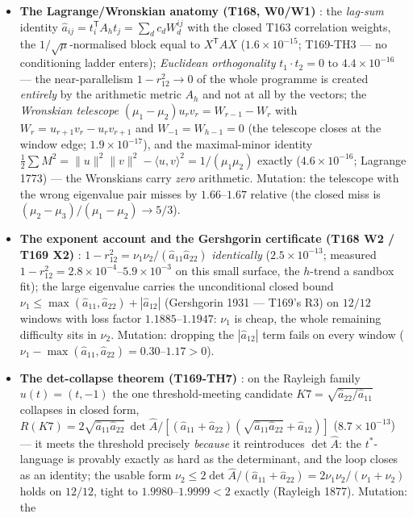 \documentclass[11pt,a4paper]{article}
\begin{document}
\begin{itemize}[leftmargin=1.5em]
\item \textbf{The Lagrange/Wronskian anatomy (T168, W0/W1)} \mE: the \emph{lag-sum}
identity $\hat a_{ij}=t_i^{\mathsf T}A_ht_j=\sum_d c_dW^{ij}_d$ with the closed T163
correlation weights, the $1/\sqrt{\mu}$-normalised block equal to
$X^{\mathsf T}AX$ ($1.6\times10^{-15}$; T169-TH3 --- no conditioning ladder enters);
\emph{Euclidean orthogonality} $t_1\cdot t_2=0$ to $4.4\times10^{-16}$ --- the
near-parallelism $1-r_{12}^2\to0$ of the whole programme is created \emph{entirely} by
the arithmetic metric $A_h$ and not at all by the vectors; the \emph{Wronskian
telescope} $(\mu_1-\mu_2)u_rv_r=W_{r-1}-W_r$ with $W_r=u_{r+1}v_r-u_rv_{r+1}$ and
$W_{-1}=W_{h-1}=0$ (the telescope closes at the window edge; $1.9\times10^{-17}$), and
the maximal-minor identity $\tfrac12\sum M^2=\|u\|^2\|v\|^2-\langle u,v\rangle^2
=1/(\mu_1\mu_2)$ exactly ($4.6\times10^{-16}$; Lagrange 1773) --- the Wronskians carry
\emph{zero} arithmetic. Mutation: the telescope with the wrong eigenvalue pair misses
by $1.66$--$1.67$ relative (the closed miss is $(\mu_2-\mu_3)/(\mu_1-\mu_2)\to5/3$).
\item \textbf{The exponent account and the Gershgorin certificate (T168 W2 / T169 X2)}
\mE: $1-r_{12}^2=\nu_1\nu_2/(\hat a_{11}\hat a_{22})$ \emph{identically}
($2.5\times10^{-13}$; measured $1-r_{12}^2=2.8\times10^{-4}$--$5.9\times10^{-3}$ on
this small surface, the $h$-trend a sandbox fit); the large eigenvalue carries the
unconditional closed bound $\nu_1\le\max(\hat a_{11},\hat a_{22})+|\hat a_{12}|$
(Gershgorin 1931 --- T169's R3) on $12/12$ windows with loss factor
$1.1885$--$1.1947$: $\nu_1$ is cheap, the whole remaining difficulty sits in $\nu_2$.
Mutation: dropping the $|\hat a_{12}|$ term fails on every window
($\nu_1-\max(\hat a_{11},\hat a_{22})=0.30$--$1.17>0$).
\item \textbf{The det-collapse theorem (T169-TH7)} \mE: on the Rayleigh family
$u(t)=(t,-1)$ the one threshold-meeting candidate $K7=\sqrt{\hat a_{22}/\hat a_{11}}$
collapses in closed form,
$R(K7)=2\sqrt{\hat a_{11}\hat a_{22}}\,\det\hat A/[(\hat a_{11}+\hat a_{22})
(\sqrt{\hat a_{11}\hat a_{22}}+\hat a_{12})]$ ($8.7\times10^{-13}$) --- it meets the
threshold precisely \emph{because} it reintroduces $\det\hat A$: the $t^*$-language is
provably exactly as hard as the determinant, and the loop closes as an identity; the
usable form $\nu_2\le2\det\hat A/(\hat a_{11}+\hat a_{22})=2\nu_1\nu_2/(\nu_1+\nu_2)$
holds on $12/12$, tight to $1.9980$--$1.9999<2$ exactly (Rayleigh 1877). Mutation: the

\end{itemize}
\end{document}
